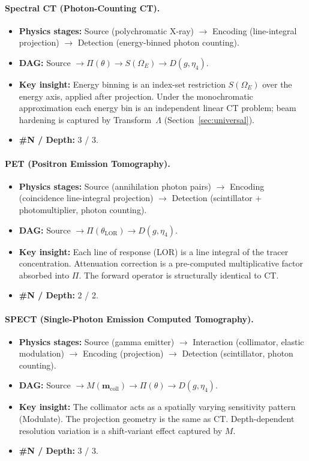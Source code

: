 \paragraph{Spectral CT (Photon-Counting CT).}
\begin{itemize}
  \item \textbf{Physics stages:} Source (polychromatic X-ray) $\to$ Encoding (line-integral projection) $\to$ Detection (energy-binned photon counting).
  \item \textbf{DAG:} Source $\to \Pi(\theta) \to S(\Omega_E) \to D(g, \eta_4)$.
  \item \textbf{Key insight:} Energy binning is an index-set restriction $S(\Omega_E)$ over the energy axis, applied after projection. Under the monochromatic approximation each energy bin is an independent linear CT problem; beam hardening is captured by Transform~$\Lambda$ (Section~\ref{sec:universal}).
  \item \textbf{\#N / Depth:} 3 / 3.
\end{itemize}

\paragraph{PET (Positron Emission Tomography).}
\begin{itemize}
  \item \textbf{Physics stages:} Source (annihilation photon pairs) $\to$ Encoding (coincidence line-integral projection) $\to$ Detection (scintillator + photomultiplier, photon counting).
  \item \textbf{DAG:} Source $\to \Pi(\theta_{\mathrm{LOR}}) \to D(g, \eta_4)$.
  \item \textbf{Key insight:} Each line of response (LOR) is a line integral of the tracer concentration. Attenuation correction is a pre-computed multiplicative factor absorbed into $\Pi$. The forward operator is structurally identical to CT.
  \item \textbf{\#N / Depth:} 2 / 2.
\end{itemize}

\paragraph{SPECT (Single-Photon Emission Computed Tomography).}
\begin{itemize}
  \item \textbf{Physics stages:} Source (gamma emitter) $\to$ Interaction (collimator, elastic modulation) $\to$ Encoding (projection) $\to$ Detection (scintillator, photon counting).
  \item \textbf{DAG:} Source $\to M(\mathbf{m}_{\mathrm{coll}}) \to \Pi(\theta) \to D(g, \eta_4)$.
  \item \textbf{Key insight:} The collimator acts as a spatially varying sensitivity pattern (Modulate). The projection geometry is the same as CT. Depth-dependent resolution variation is a shift-variant effect captured by $M$.
  \item \textbf{\#N / Depth:} 3 / 3.
\end{itemize}

